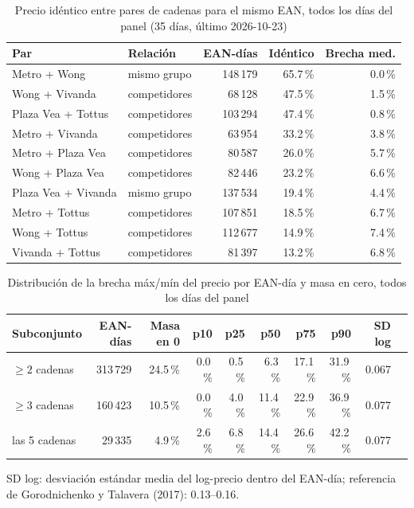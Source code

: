 
\begin{table}[htbp]
\caption{Precio id\'entico entre pares de cadenas para el mismo EAN, todos los d\'ias del panel (35 d\'ias, \'ultimo 2026-10-23)}
\label{tab:identidad}
\centering\scriptsize\setlength{\tabcolsep}{3pt}
\begin{tabular}{@{}llrrr@{}}
\toprule
Par & Relaci\'on & EAN-d\'ias & Id\'entico & Brecha med. \\
\midrule
Metro + Wong & mismo grupo & 148\,179 & 65.7\,\% & 0.0\,\% \\
Wong + Vivanda & competidores & 68\,128 & 47.5\,\% & 1.5\,\% \\
Plaza Vea + Tottus & competidores & 103\,294 & 47.4\,\% & 0.8\,\% \\
Metro + Vivanda & competidores & 63\,954 & 33.2\,\% & 3.8\,\% \\
Metro + Plaza Vea & competidores & 80\,587 & 26.0\,\% & 5.7\,\% \\
Wong + Plaza Vea & competidores & 82\,446 & 23.2\,\% & 6.6\,\% \\
Plaza Vea + Vivanda & mismo grupo & 137\,534 & 19.4\,\% & 4.4\,\% \\
Metro + Tottus & competidores & 107\,851 & 18.5\,\% & 6.7\,\% \\
Wong + Tottus & competidores & 112\,677 & 14.9\,\% & 7.4\,\% \\
Vivanda + Tottus & competidores & 81\,397 & 13.2\,\% & 6.8\,\% \\
\bottomrule\end{tabular}\end{table}

\begin{table}[t]
\caption{Distribuci\'on de la brecha m\'ax/m\'in del precio por EAN-d\'ia y masa en cero, todos los d\'ias del panel}
\label{tab:brecha}
\centering\scriptsize\setlength{\tabcolsep}{4pt}
\begin{tabular}{@{}lrrrrrrrrr@{}}
\toprule
Subconjunto & EAN-d\'ias & Masa en 0 & p10 & p25 & p50 & p75 & p90 & SD log \\
\midrule
$\geq 2$ cadenas & 313\,729 & 24.5\,\% & 0.0\,\% & 0.5\,\% & 6.3\,\% & 17.1\,\% & 31.9\,\% & 0.067 \\
$\geq 3$ cadenas & 160\,423 & 10.5\,\% & 0.0\,\% & 4.0\,\% & 11.4\,\% & 22.9\,\% & 36.9\,\% & 0.077 \\
las 5 cadenas & 29\,335 & 4.9\,\% & 2.6\,\% & 6.8\,\% & 14.4\,\% & 26.6\,\% & 42.2\,\% & 0.077 \\
\bottomrule\end{tabular}
\par\smallskip\raggedright\scriptsize SD log: desviaci\'on est\'andar media del log-precio dentro del EAN-d\'ia; referencia de Gorodnichenko y Talavera (2017): 0.13--0.16.
\end{table}


